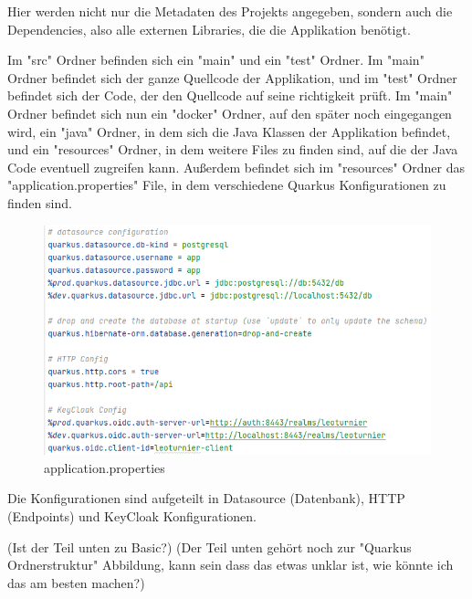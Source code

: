 Hier werden nicht nur die Metadaten des Projekts angegeben, sondern auch die Dependencies, also alle externen Libraries, die die Applikation benötigt. 

Im "src" Ordner befinden sich ein "main" und ein "test" Ordner. Im "main" Ordner befindet sich der ganze Quellcode der Applikation, und im "test" Ordner befindet sich der Code, der den Quellcode auf seine richtigkeit prüft.
Im "main" Ordner befindet sich nun ein "docker" Ordner, auf den später noch eingegangen wird, ein "java" Ordner, in dem sich die Java Klassen der Applikation befindet, und ein "resources" Ordner, in dem weitere Files zu finden sind, 
auf die der Java Code eventuell zugreifen kann. Außerdem befindet sich im "resources" Ordner das "application.properties" File, in dem verschiedene Quarkus Konfigurationen zu finden sind.

\begin{figure}[H]
    \includegraphics[scale=0.6]{pics/application.properties.png}
    \caption{application.properties}
\end{figure}

Die Konfigurationen sind aufgeteilt in Datasource (Datenbank), HTTP (Endpoints) und KeyCloak Konfigurationen. 

(Ist der Teil unten zu Basic?) (Der Teil unten gehört noch zur "Quarkus Ordnerstruktur" Abbildung, kann sein dass das etwas unklar ist, wie könnte ich das am besten machen?)

